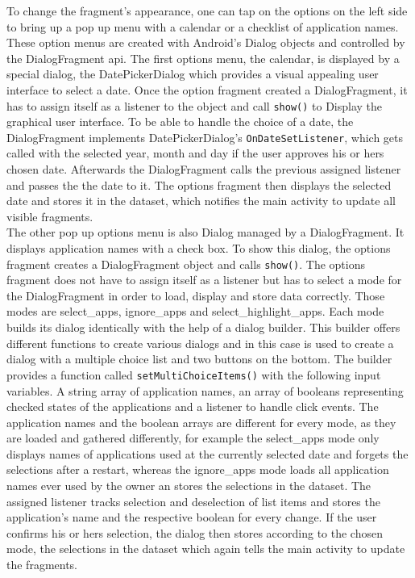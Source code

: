 To  change the fragment's appearance, one can tap on the options on the left side to bring up a pop up menu with a calendar or a checklist of application names. These option menus are created with Android's Dialog objects and controlled by the DialogFragment api. The first options menu, the calendar, is displayed by a special dialog, the DatePickerDialog which provides a visual appealing user interface to select a date. Once the option fragment created a DialogFragment, it has to assign itself as a listener to the object and call \lstinline$show()$ to Display the graphical user interface. To be able to handle the choice of a date, the DialogFragment implements DatePickerDialog's \lstinline$OnDateSetListener$, which gets called with the selected year, month and day if the user approves his or hers chosen date. Afterwards the DialogFragment calls the previous assigned listener and passes the the date to it. The options fragment then displays the selected date and stores it in the dataset, which notifies the main activity to update all visible fragments.\\
The other pop up options menu is also Dialog managed by a DialogFragment. It displays application names with a check box. To show this dialog, the options fragment creates a DialogFragment object and calls \lstinline$show()$. The options fragment does not have to assign itself as a listener but has to select a mode for the DialogFragment in order to load, display and store data correctly. Those modes are select\_apps, ignore\_apps and select\_highlight\_apps. Each mode builds its dialog identically with the help of a dialog builder. This builder offers different functions to create various dialogs and in this case is used to create a dialog with a multiple choice list and two buttons on the bottom. The builder provides a function called \lstinline$setMultiChoiceItems()$ with the following input variables. A string array of application names, an array of booleans representing checked states of the applications and a listener to handle click events. The application names and the boolean arrays are different for every mode, as they are loaded and gathered differently, for example the select\_apps mode only displays names of applications used at the currently selected date and forgets the selections after a restart, whereas the ignore\_apps mode loads all application names ever used by the owner an stores the selections in the dataset. The assigned listener tracks selection and deselection of list items and stores the application's name and the respective boolean for every change. If the user confirms his or hers selection, the dialog then stores according to the chosen mode, the selections in the dataset which again tells the main activity to update the fragments.

